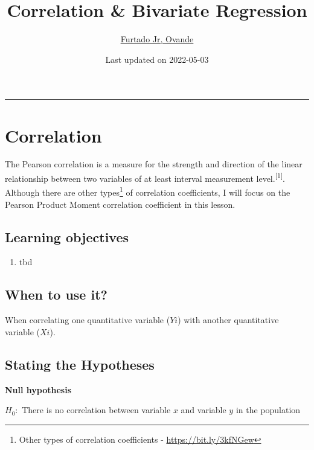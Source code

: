 \documentclass[
]{article}
\title{Correlation \& Bivariate Regression}
\author{\href{http://drfurtado.us}{Furtado Jr, Ovande}}
\date{Last updated on 2022-05-03}
\providecommand{\tightlist}{%
  \setlength{\itemsep}{0pt}\setlength{\parskip}{0pt}}
\begin{document}
\maketitle

{
\setcounter{tocdepth}{2}
\tableofcontents
}
\begin{center}\rule{0.5\linewidth}{0.5pt}\end{center}

\hypertarget{correlation}{%
\section{Correlation}\label{correlation}}

The Pearson correlation is a measure for the strength and direction of the linear relationship between two variables of at least interval measurement level.\textsuperscript{{[}1{]}}. Although there are other types\footnote{Other types of correlation coefficients - \url{https://bit.ly/3kfNGew}} of correlation coefficients, I will focus on the Pearson Product Moment correlation coefficient in this lesson.

\hypertarget{learning-objectives}{%
\subsection{Learning objectives}\label{learning-objectives}}

\begin{enumerate}
\def\labelenumi{\arabic{enumi}.}
\tightlist
\item
  tbd
\end{enumerate}

\hypertarget{when-to-use-it}{%
\subsection{When to use it?}\label{when-to-use-it}}

When correlating one quantitative variable (\(Yi\)) with another quantitative variable (\(Xi\)).

\hypertarget{stating-the-hypotheses}{%
\subsection{Stating the Hypotheses}\label{stating-the-hypotheses}}

\textbf{Null hypothesis}

\(H_0:\) There is no correlation between variable \(x\) and variable \(y\) in the population
\end{document}
